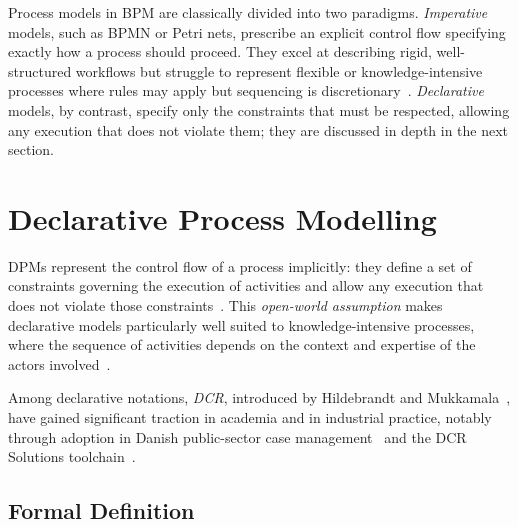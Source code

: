 Process models in BPM are classically divided into two paradigms.
\emph{Imperative} models, such as BPMN or Petri nets, prescribe an explicit
control flow specifying exactly how a process should proceed.  They excel at
describing rigid, well-structured workflows but struggle to represent flexible
or knowledge-intensive processes where rules may apply but sequencing is
discretionary~\cite{Groefsema2024SupportingFamilies}.  \emph{Declarative}
models, by contrast, specify only the constraints that must be respected,
allowing any execution that does not violate them; they are discussed in depth
in the next section.

\section{Declarative Process Modelling}
\label{sec:declarative}

\acp{DPM} represent the control flow of a process implicitly: they define a
set of constraints governing the execution of activities and allow any
execution that does not violate those
constraints~\cite{Trinh2024OnOfConstraints}.  This \emph{open-world assumption}
makes declarative models particularly well suited to knowledge-intensive
processes, where the sequence of activities depends on the context and expertise
of the actors involved~\cite{Groefsema2024SupportingFamilies}.

Among declarative notations, \emph{\ac{DCR}},
introduced by Hildebrandt and
Mukkamala~\cite{Hildebrandt2011DeclarativeGraphs}, have gained significant
traction in academia and in industrial practice,
notably through adoption in Danish public-sector case
management~\cite{Slaats2013Business2013} and the DCR Solutions
toolchain~\cite{Marquard2015Business2015,Christfort2025DCR-JS:Mining}.

\subsection{Formal Definition}

